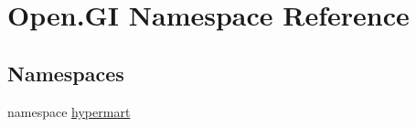 \hypertarget{namespace_open_1_1_g_i}{}\section{Open.\+GI Namespace Reference}
\label{namespace_open_1_1_g_i}
\subsection*{Namespaces}
\begin{DoxyCompactItemize}
\item 
namespace \hyperlink{namespace_open_1_1_g_i_1_1hypermart}{hypermart}
\end{DoxyCompactItemize}
